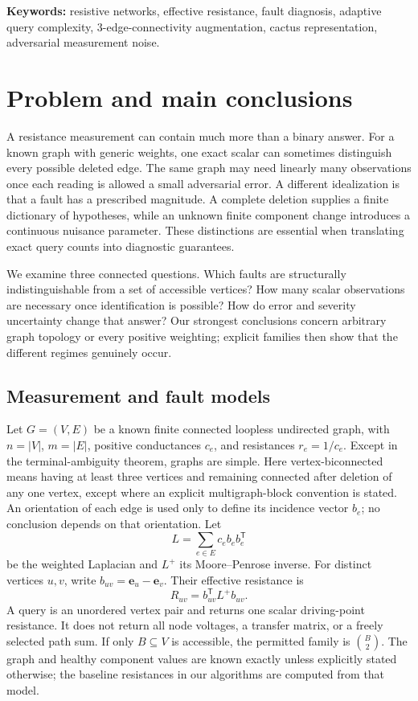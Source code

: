 \documentclass[11pt,letterpaper]{article}
\begin{document}
\vspace{0.12in}
\noindent\textbf{Keywords:} resistive networks, effective resistance, fault diagnosis, adaptive query complexity, 3-edge-connectivity augmentation, cactus representation, adversarial measurement noise.
\clearpage
\tableofcontents
\clearpage
\section{Problem and main conclusions}
A resistance measurement can contain much more than a binary answer. For a known graph with generic weights, one exact scalar can sometimes distinguish every possible deleted edge. The same graph may need linearly many observations once each reading is allowed a small adversarial error. A different idealization is that a fault has a prescribed magnitude. A complete deletion supplies a finite dictionary of hypotheses, while an unknown finite component change introduces a continuous nuisance parameter. These distinctions are essential when translating exact query counts into diagnostic guarantees.

We examine three connected questions. Which faults are structurally indistinguishable from a set of accessible vertices? How many scalar observations are necessary once identification is possible? How do error and severity uncertainty change that answer? Our strongest conclusions concern arbitrary graph topology or every positive weighting; explicit families then show that the different regimes genuinely occur.

\subsection{Measurement and fault models}
Let $G=(V,E)$ be a known finite connected loopless undirected graph, with $n=|V|$, $m=|E|$, positive conductances $c_e$, and resistances $r_e=1/c_e$. Except in the terminal-ambiguity theorem, graphs are simple. Here vertex-biconnected means having at least three vertices and remaining connected after deletion of any one vertex, except where an explicit multigraph-block convention is stated. An orientation of each edge is used only to define its incidence vector $b_e$; no conclusion depends on that orientation. Let
\[
 L=\sum_{e\in E}c_e b_e b_e^{\mathsf T}
\]
be the weighted Laplacian and $L^+$ its Moore--Penrose inverse. For distinct vertices $u,v$, write $b_{uv}=\mathbf e_u-\mathbf e_v$. Their effective resistance is
\[
 R_{uv}=b_{uv}^{\mathsf T}L^+b_{uv}.
\]
A query is an unordered vertex pair and returns one scalar driving-point resistance. It does not return all node voltages, a transfer matrix, or a freely selected path sum. If only $B\subseteq V$ is accessible, the permitted family is $\binom B2$. The graph and healthy component values are known exactly unless explicitly stated otherwise; the baseline resistances in our algorithms are computed from that model.
\end{document}
